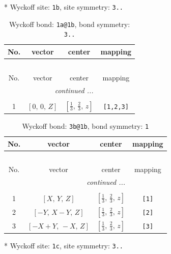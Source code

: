 \documentclass[fleqn,8pt]{jsarticle}
\begin{document}
* Wyckoff site: {\tt 1b}, site symmetry: {\tt 3..}
\renewcommand{\arraystretch}{1.2}
\begin{longtable}{cccc}
\caption{Wyckoff bond: {\tt 1a@1b}, bond symmetry: {\tt 3..}}
 \\
 \hline \hline
No. & vector & center & mapping \\ \hline \endfirsthead

\multicolumn{3}{l}{\tablename\ \thetable{}} \\
 \hline \hline
No. & vector & center & mapping \\ \hline \endhead

 \hline \hline
\multicolumn{3}{r}{\footnotesize\it continued ...} \\ \endfoot

 \hline \hline
\multicolumn{3}{r}{} \\ \endlastfoot

1 & $\left[ 0,\, 0,\, Z \right]$ & $\left[ \frac{1}{3},\, \frac{2}{3},\, z \right]$ & {\tt [1,2,3]} \\
\end{longtable}
\renewcommand{\arraystretch}{1.2}
\begin{longtable}{cccc}
\caption{Wyckoff bond: {\tt 3b@1b}, bond symmetry: {\tt 1}}
 \\
 \hline \hline
No. & vector & center & mapping \\ \hline \endfirsthead

\multicolumn{3}{l}{\tablename\ \thetable{}} \\
 \hline \hline
No. & vector & center & mapping \\ \hline \endhead

 \hline \hline
\multicolumn{3}{r}{\footnotesize\it continued ...} \\ \endfoot

 \hline \hline
\multicolumn{3}{r}{} \\ \endlastfoot

1 & $\left[ X,\, Y,\, Z \right]$ & $\left[ \frac{1}{3},\, \frac{2}{3},\, z \right]$ & {\tt [1]} \\ \hline
2 & $\left[ - Y,\, X - Y,\, Z \right]$ & $\left[ \frac{1}{3},\, \frac{2}{3},\, z \right]$ & {\tt [2]} \\ \hline
3 & $\left[ - X + Y,\, - X,\, Z \right]$ & $\left[ \frac{1}{3},\, \frac{2}{3},\, z \right]$ & {\tt [3]} \\
\end{longtable}
* Wyckoff site: {\tt 1c}, site symmetry: {\tt 3..}
\renewcommand{\arraystretch}{1.2}
\end{document}
